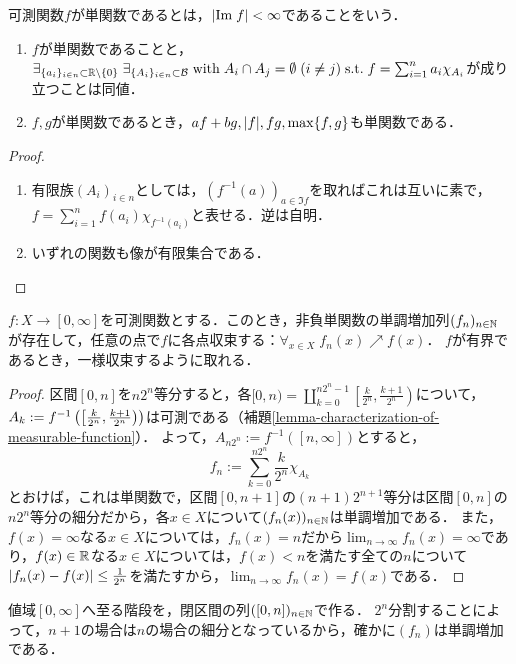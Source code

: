 \documentclass[uplatex, dvipdfmx]{jsreport}
\begin{document}
\begin{definition}
    可測関数$f$が単関数であるとは，$\lvert\mathrm{Im}\; f\rvert<\infty$であることをいう．
\end{definition}

\begin{lemma}\mbox{}
    \begin{enumerate}
        \item $f$が単関数であることと，$\exists_{\{a_i\}_{i\in n}\subset\mathbb{R}\setminus\{0\}}\;\exists_{\{A_i\}_{i\in n}\subset\mathcal{B}}\;\mathrm{with}\;A_i\cap A_j=\emptyset\;(i\ne j)\;\mathrm{s.t.}\; f=\sum_{i=1}^na_i\chi_{A_i}$が成り立つことは同値．
        \item $f,g$が単関数であるとき，$af+bg,\lvert f\rvert,fg,\max\{f,g\}$も単関数である．
    \end{enumerate}
\end{lemma}
\begin{proof}\mbox{}
    \begin{enumerate}
        \item 有限族$(A_i)_{i\in n}$としては，$(f^{-1}(a))_{a\in\Im f}$を取ればこれは互いに素で，$f=\sum^n_{i=1}f(a_i)\chi_{f^{-1}(a_i)}$と表せる．逆は自明．
        \item いずれの関数も像が有限集合である．
    \end{enumerate}
\end{proof}

\begin{theorem}[単関数近似]\label{thm-simple-function-approximation}
    $f:X\to[0,\infty]$を可測関数とする．このとき，非負単関数の単調増加列$(f_n)_{n\in\mathbb{N}}$が存在して，任意の点で$f$に各点収束する：$\forall_{x\in X}\;f_n(x)\nearrow f(x)$．
    $f$が有界であるとき，一様収束するように取れる．
\end{theorem}
\begin{proof}
    区間$[0,n]$を$n2^n$等分すると，各$[0,n)=\coprod_{k=0}^{n2^n-1}\left[\frac{k}{2^n},\frac{k+1}{2^n}\right)$について，$A_k:=f^{-1}\left(\left[\frac{k}{2^n},\frac{k+1}{2^n}\right)\right)$は可測である（補題\ref{lemma-characterization-of-measurable-function}）．
    よって，$A_{n2^n}:=f^{-1}([n,\infty])$とすると，
    \[f_n:=\sum^{n2^n}_{k=0}\frac{k}{2^n}\chi_{A_k}\]
    とおけば，これは単関数で，区間$[0,n+1]$の$(n+1)2^{n+1}$等分は区間$[0,n]$の$n2^n$等分の細分だから，各$x\in X$について$(f_n(x))_{n\in\mathbb{N}}$は単調増加である．
    また，$f(x)=\infty$なる$x\in X$については，$f_n(x)=n$だから$\lim_{n\to\infty}f_n(x)=\infty$であり，$f(x)\in\mathbb{R}$なる$x\in X$については，$f(x)<n$を満たす全ての$n$について$\lvert f_n(x)-f(x)\rvert\le\frac{1}{2^n}$を満たすから，$\lim_{n\to\infty}f_n(x)=f(x)$である．
\end{proof}
\begin{remarks}
    値域$[0,\infty]$へ至る階段を，閉区間の列$([0,n])_{n\in\mathbb{N}}$で作る．
    $2^n$分割することによって，$n+1$の場合は$n$の場合の細分となっているから，確かに$(f_n)$は単調増加である．
\end{remarks}
\end{document}
